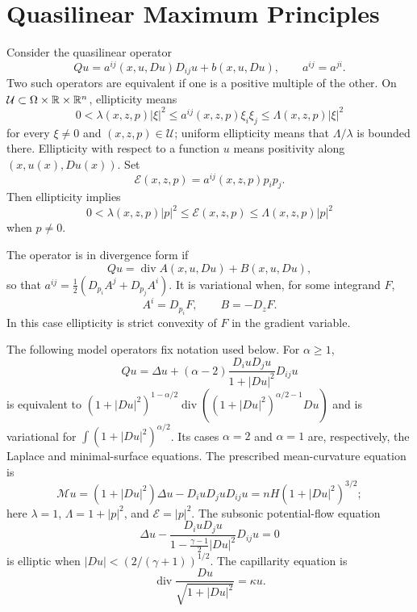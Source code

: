 \chapter{Quasilinear Maximum Principles}

Consider the quasilinear operator
\begin{equation}
Qu=a^{ij}(x,u,Du)D_{ij}u+b(x,u,Du),
\qquad a^{ij}=a^{ji}.
\tag{10.1}
\end{equation}
Two such operators are equivalent if one is a positive multiple of the other.
On $\mathcal U\subset\Omega\times\mathbb{R}\times\mathbb{R}^n$, ellipticity means
\begin{equation}
0<\lambda(x,z,p)|\xi|^2
\le a^{ij}(x,z,p)\xi_i\xi_j
\le\Lambda(x,z,p)|\xi|^2
\tag{10.2}
\end{equation}
for every $\xi\ne0$ and $(x,z,p)\in\mathcal U$; uniform ellipticity means
that $\Lambda/\lambda$ is bounded there.  Ellipticity with respect to a
function $u$ means positivity along $(x,u(x),Du(x))$.  Set
\begin{equation}
\mathcal E(x,z,p)=a^{ij}(x,z,p)p_ip_j.
\tag{10.3}
\end{equation}
Then ellipticity implies
\begin{equation}
0<\lambda(x,z,p)|p|^2\le\mathcal E(x,z,p)
\le\Lambda(x,z,p)|p|^2
\tag{10.4}
\end{equation}
when $p\ne0$.

The operator is in divergence form if
\begin{equation}
Qu=\operatorname{div}A(x,u,Du)+B(x,u,Du),
\tag{10.5}
\end{equation}
so that
$a^{ij}=\tfrac12(D_{p_i}A^j+D_{p_j}A^i)$.  It is variational when, for
some integrand $F$,
\begin{equation}
A^i=D_{p_i}F,\qquad B=-D_zF.
\tag{10.6}
\end{equation}
In this case ellipticity is strict convexity of $F$ in the gradient variable.

The following model operators fix notation used below.  For $\alpha\ge1$,
\[
Qu=\Delta u+(\alpha-2)\frac{D_iuD_ju}{1+|Du|^2}D_{ij}u
\]
is equivalent to
$(1+|Du|^2)^{1-\alpha/2}\operatorname{div}
((1+|Du|^2)^{\alpha/2-1}Du)$ and is variational for
$\int(1+|Du|^2)^{\alpha/2}$.  Its cases $\alpha=2$ and $\alpha=1$ are,
respectively, the Laplace and minimal-surface equations.  The prescribed
mean-curvature equation is
\begin{equation}
\mathcal Mu=(1+|Du|^2)\Delta u-D_iuD_juD_{ij}u
=nH(1+|Du|^2)^{3/2};
\tag{10.7}
\end{equation}
here $\lambda=1$, $\Lambda=1+|p|^2$, and $\mathcal E=|p|^2$.
The subsonic potential-flow equation
\begin{equation}
\Delta u-
\frac{D_iuD_ju}{1-\frac{\gamma-1}{2}|Du|^2}D_{ij}u=0
\tag{10.8}
\end{equation}
is elliptic when $|Du|<(2/(\gamma+1))^{1/2}$.  The capillarity equation is
\begin{equation}
\operatorname{div}\frac{Du}{\sqrt{1+|Du|^2}}=\kappa u.
\tag{10.9}
\end{equation}

